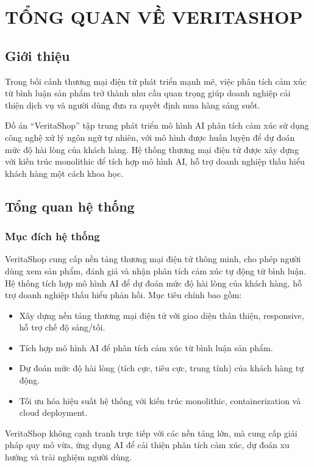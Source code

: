 
\newpage

\section{\textbf{TỔNG QUAN VỀ VERITASHOP}}

\subsection{Giới thiệu}
Trong bối cảnh thương mại điện tử phát triển mạnh mẽ, việc phân tích cảm xúc từ bình luận sản phẩm trở thành nhu cầu quan trọng giúp doanh nghiệp cải thiện dịch vụ và người dùng đưa ra quyết định mua hàng sáng suốt.

Đồ án ``VeritaShop'' tập trung phát triển mô hình AI phân tích cảm xúc sử dụng công nghệ xử lý ngôn ngữ tự nhiên, với mô hình được huấn luyện để dự đoán mức độ hài lòng của khách hàng. Hệ thống thương mại điện tử được xây dựng với kiến trúc monolithic để tích hợp mô hình AI, hỗ trợ doanh nghiệp thấu hiểu khách hàng một cách khoa học.

\subsection{Tổng quan hệ thống}
\subsubsection{Mục đích hệ thống}
VeritaShop cung cấp nền tảng thương mại điện tử thông minh, cho phép người dùng xem sản phẩm, đánh giá và nhận phân tích cảm xúc tự động từ bình luận. Hệ thống tích hợp mô hình AI để dự đoán mức độ hài lòng của khách hàng, hỗ trợ doanh nghiệp thấu hiểu phản hồi. Mục tiêu chính bao gồm:
\begin{itemize}
    \item Xây dựng nền tảng thương mại điện tử với giao diện thân thiện, responsive, hỗ trợ chế độ sáng/tối.
    \item Tích hợp mô hình AI để phân tích cảm xúc từ bình luận sản phẩm.
    \item Dự đoán mức độ hài lòng (tích cực, tiêu cực, trung tính) của khách hàng tự động.
    \item Tối ưu hóa hiệu suất hệ thống với kiến trúc monolithic, containerization và cloud deployment.
\end{itemize}
VeritaShop không cạnh tranh trực tiếp với các nền tảng lớn, mà cung cấp giải pháp quy mô vừa, ứng dụng AI để cải thiện phân tích cảm xúc, dự đoán xu hướng và trải nghiệm người dùng.

